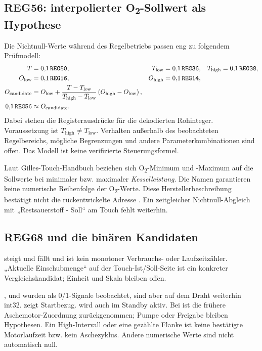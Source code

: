 \documentclass[10pt,a4paper]{article}
\begin{document}
\subsection{REG56: interpolierter O\texorpdfstring{\textsubscript{2}}{2}-Sollwert als Hypothese}
Die Nichtnull-Werte während des Regelbetriebs passen eng zu folgendem Prüfmodell:
\begin{align*}
T&=0{,}1\,\texttt{REG50},&T_{\mathrm{low}}&=0{,}1\,\texttt{REG36},&T_{\mathrm{high}}&=0{,}1\,\texttt{REG38},\\
O_{\mathrm{low}}&=0{,}1\,\texttt{REG16},&O_{\mathrm{high}}&=0{,}1\,\texttt{REG14},\\
O_{\mathrm{candidate}}&=O_{\mathrm{low}}+
\frac{T-T_{\mathrm{low}}}{T_{\mathrm{high}}-T_{\mathrm{low}}}
\left(O_{\mathrm{high}}-O_{\mathrm{low}}\right),\\
0{,}1\,\texttt{REG56}&\approx O_{\mathrm{candidate}}.
\end{align*}
Dabei stehen die Registerausdrücke für die dekodierten Rohinteger. Voraussetzung ist $T_{\mathrm{high}}\ne T_{\mathrm{low}}$. Verhalten außerhalb des beobachteten Regelbereichs, mögliche Begrenzungen und andere Parameterkombinationen sind offen. Das Modell ist keine verifizierte Steuerungsformel.

Laut Gilles-Touch-Handbuch beziehen sich O\textsubscript{2}-Minimum und -Maximum auf die Sollwerte bei minimaler bzw. maximaler \emph{Kesselleistung}. Die Namen garantieren keine numerische Reihenfolge der O\textsubscript{2}-Werte. Diese Herstellerbeschreibung bestätigt nicht die rückentwickelte Adresse . Ein zeitgleicher Nichtnull-Abgleich mit „Restsauerstoff - Soll“ am Touch fehlt weiterhin.

\subsection{REG68 und die binären Kandidaten}
 steigt und fällt und ist kein monotoner Verbrauchs- oder Laufzeitzähler. „Aktuelle Einschubmenge“ auf der Touch-Ist/Soll-Seite ist ein konkreter Vergleichskandidat; Einheit und Skala bleiben offen.

,  und  wurden als 0/1-Signale beobachtet, sind aber auf dem Draht weiterhin int32.  zeigt Startbezug.  wird auch im Standby aktiv. Bei  ist die frühere Aschemotor-Zuordnung zurückgenommen; Pumpe oder Freigabe bleiben Hypothesen. Ein High-Intervall oder eine gezählte Flanke ist keine bestätigte Motorlaufzeit bzw. kein Aschezyklus. Andere numerische Werte sind nicht automatisch null.
\end{document}
